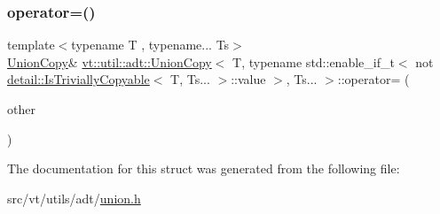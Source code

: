 \subsubsection{\texorpdfstring{operator=()}{operator=()}\hspace{0.1cm}{\footnotesize\ttfamily [2/2]}}
{\footnotesize\ttfamily template$<$typename T , typename... Ts$>$ \\
\hyperlink{structvt_1_1util_1_1adt_1_1_union_copy}{Union\+Copy}\& \hyperlink{structvt_1_1util_1_1adt_1_1_union_copy}{vt\+::util\+::adt\+::\+Union\+Copy}$<$ T, typename std\+::enable\+\_\+if\+\_\+t$<$ not \hyperlink{structvt_1_1util_1_1adt_1_1detail_1_1_is_trivially_copyable}{detail\+::\+Is\+Trivially\+Copyable}$<$ T, Ts... $>$\+::value $>$, Ts... $>$\+::operator= (\begin{DoxyParamCaption}\item[{\hyperlink{structvt_1_1util_1_1adt_1_1_union_copy}{Union\+Copy}$<$ T, typename std\+::enable\+\_\+if\+\_\+t$<$ not \hyperlink{structvt_1_1util_1_1adt_1_1detail_1_1_is_trivially_copyable}{detail\+::\+Is\+Trivially\+Copyable}$<$ T, Ts... $>$\+::value $>$, Ts... $>$ \&\&}]{other }\end{DoxyParamCaption})\hspace{0.3cm}{\ttfamily [inline]}}



The documentation for this struct was generated from the following file\+:\begin{DoxyCompactItemize}
\item 
src/vt/utils/adt/\hyperlink{union_8h}{union.\+h}\end{DoxyCompactItemize}
